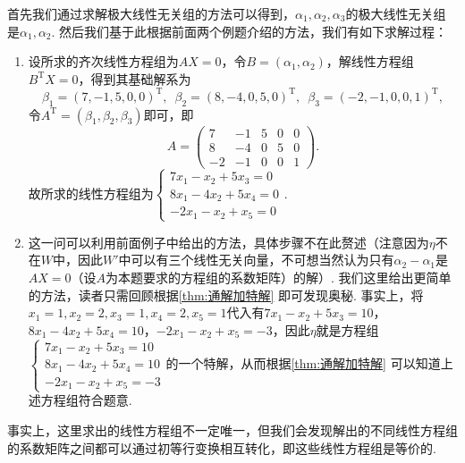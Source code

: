 \begin{solution}
    首先我们通过求解极大线性无关组的方法可以得到，$\alpha_1,\alpha_2,\alpha_3$的极大线性无关组是$\alpha_1,\alpha_2$. 然后我们基于此根据前面两个例题介绍的方法，我们有如下求解过程：
    \begin{enumerate}
        \item 设所求的齐次线性方程组为$AX=0$，令$B=(\alpha_1,\alpha_2)$，解线性方程组$B^\mathrm{T}X=0$，得到其基础解系为
              \[\beta_1=(7,-1,5,0,0)^\mathrm{T},\enspace\beta_2=(8,-4,0,5,0)^\mathrm{T},\enspace\beta_3=(-2,-1,0,0,1)^\mathrm{T},\]
              令$A^\mathrm{T}=(\beta_1,\beta_2,\beta_3)$即可，即
              \[A=\begin{pmatrix}
                      7 & -1 & 5 & 0 & 0 \\ 8 & -4 & 0 & 5 & 0 \\ -2 & -1 & 0 & 0 & 1
                  \end{pmatrix}.\]
              故所求的线性方程组为$\begin{cases}
                      7x_1-x_2+5x_3=0 \\ 8x_1-4x_2+5x_4=0 \\ -2x_1-x_2+x_5=0
                  \end{cases}$.

        \item 这一问可以利用前面例子中给出的方法，具体步骤不在此赘述（注意因为$\eta$不在$W$中，因此$W'$中可以有三个线性无关向量，不可想当然认为只有$\alpha_2-\alpha_1$是$AX=0$（设$A$为本题要求的方程组的系数矩阵）的解）. 我们这里给出更简单的方法，读者只需回顾根据\autoref{thm:通解加特解} 即可发现奥秘. 事实上，将$x_1=1,x_2=2,x_3=1,x_4=2,x_5=1$代入有$7x_1-x_2+5x_3=10$，$8x_1-4x_2+5x_4=10$，$-2x_1-x_2+x_5=-3$，因此$\eta$就是方程组$\begin{cases}
                      7x_1-x_2+5x_3=10 \\ 8x_1-4x_2+5x_4=10 \\ -2x_1-x_2+x_5=-3
                  \end{cases}$的一个特解，从而根据\autoref{thm:通解加特解} 可以知道上述方程组符合题意.
    \end{enumerate}
\end{solution}

事实上，这里求出的线性方程组不一定唯一，但我们会发现解出的不同线性方程组的系数矩阵之间都可以通过初等行变换相互转化，即这些线性方程组是等价的.

